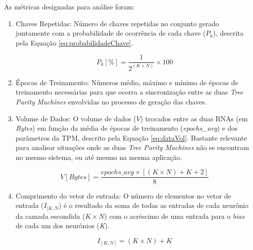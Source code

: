 \documentclass[12pt]{article}
\newcommand{\Bytes}{\textit{Bytes}\xspace}
\begin{document}
            As métricas designadas para análise foram:
            \begin{enumerate}
                \item Chaves Repetidas:
                    Número de chaves repetidas no conjunto gerado juntamente com a probabilidade de ocorrência de cada chave ($P_k$), descrita pela Equação \eqref{eq:probabilidadeChave}.
                    
                    \begin{equation}
                        \label{eq:probabilidadeChave}
                        P_k [\%] = \frac{1}{2^{(K \times N)}} \times 100
                    \end{equation}
                
                \item Épocas de Treinamento:
                    Números médio, máximo e mínimo de épocas de treinamento necessárias para que ocorra a sincronização entre as duas \textit{Tree Parity Machines} envolvidas no processo de geração das chaves.
                
                \item Volume de Dados:
                    O volume de dados ($V$) trocados entre as duas RNAs (em \Bytes) em função da média de épocas de treinamento (\textit{epochs\_avg}) e dos parâmetros da TPM, descrito pela Equação \eqref{eq:dataVol}. Bastante relevante para analisar situações onde as duas \textit{Tree Parity Machines} não se encontram no mesmo sistema, ou até mesmo na mesma aplicação.
                    
                    \begin{equation}
                        \label{eq:dataVol}
                        V [\Bytes] = \frac{epochs\_avg \times [(K \times N) + K + 2]}{8}
                    \end{equation}
                    
                \item Comprimento do vetor de entrada:
                    O número de elementos no vetor de entrada ($I_{[K,N}$) é o resultado da soma de todas as entradas de cada neurônio da camada escondida ($K \times N$) com o acréscimo de uma entrada para o \textit{bias} de cada um dos neurônios (\textit{K}).
                    
                    \begin{equation}
                        \label{eq:inputArraySize}
                        I_{[K, N]} = (K \times N) + K
                    \end{equation}
           

\end{enumerate}
\end{document}
